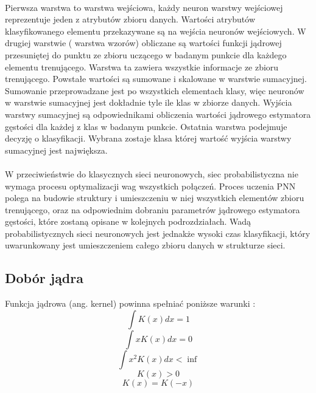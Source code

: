 \documentclass[a4paper,12pt,twoside]{article}
\begin{document}
\paragraph{}
Pierwsza warstwa to warstwa wejściowa, każdy neuron warstwy wejściowej reprezentuje jeden z atrybutów zbioru danych. Wartości atrybutów klasyfikowanego elementu przekazywane są na wejścia neuronów wejściowych. W drugiej warstwie ( warstwa wzorów) obliczane są wartości funkcji jądrowej przesuniętej do punktu ze zbioru uczącego w badanym punkcie dla każdego elementu trenującego. Warstwa ta zawiera wszystkie informacje ze zbioru trenującego. Powstałe wartości są sumowane i skalowane w warstwie sumacyjnej. Sumowanie przeprowadzane jest po wszystkich elementach klasy, więc neuronów w warstwie sumacyjnej jest dokładnie tyle ile klas w zbiorze danych. Wyjścia warstwy sumacyjnej są odpowiednikami obliczenia wartości jądrowego estymatora gęstości dla każdej z klas w badanym punkcie.   Ostatnia warstwa podejmuje decyzję o klasyfikacji. Wybrana zostaje klasa której wartość wyjścia warstwy sumacyjnej jest największa.
\paragraph{}
W przeciwieństwie do klasycznych sieci neuronowych, siec probabilistyczna nie wymaga procesu optymalizacji wag wszystkich połączeń. Proces uczenia PNN polega na budowie struktury i umieszczeniu w niej wszystkich elementów zbioru trenującego, oraz na odpowiednim dobraniu parametrów jądrowego estymatora gęstości, które zostaną opisane w kolejnych podrozdziałach. Wadą probabilistycznych sieci neuronowych jest jednakże wysoki czas klasyfikacji, który uwarunkowany jest umieszczeniem całego zbioru danych w strukturze sieci.
\subsection{Dobór jądra}
Funkcja jądrowa (ang. kernel) powinna spełniać poniższe warunki \cite{kde2}:
\begin{equation} \int K(x)dx=1
\end{equation}
\begin{equation} \int xK(x)dx=0
\end{equation}
\begin{equation} \int x^2K(x)dx<\inf
\end{equation}
\begin{equation}  K(x)>0
\end{equation}
\begin{equation}  K(x)=K(-x)
\end{equation}
\end{document}
